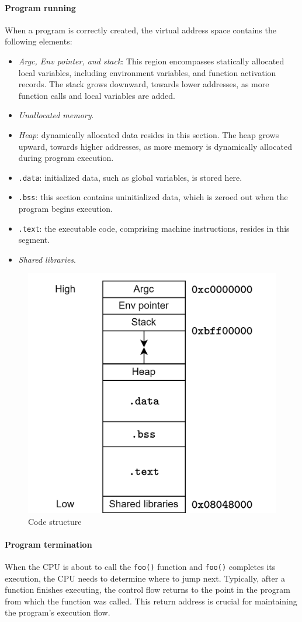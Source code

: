 \paragraph*{Program running}
When a program is correctly created, the virtual address space contains the following elements:
\begin{itemize}
    \item \textit{Argc, Env pointer, and stack}: This region encompasses statically allocated local variables, including environment variables, and function activation records. 
        The stack grows downward, towards lower addresses, as more function calls and local variables are added.
    \item \textit{Unallocated memory}.
    \item \textit{Heap}: dynamically allocated data resides in this section. 
        The heap grows upward, towards higher addresses, as more memory is dynamically allocated during program execution.
    \item \texttt{.data}: initialized data, such as global variables, is stored here.
    \item \texttt{.bss}: this section contains uninitialized data, which is zeroed out when the program begins execution.
    \item \texttt{.text}: the executable code, comprising machine instructions, resides in this segment.
    \item \textit{Shared libraries}. 
\end{itemize}
\begin{figure}[H]
    \centering
    \includegraphics[width=0.6\linewidth]{images/stack.png}
    \caption{Code structure}
\end{figure}

\paragraph*{Program termination}
When the CPU is about to call the \texttt{foo()} function and \texttt{foo()} completes its execution, the CPU needs to determine where to jump next. 
Typically, after a function finishes executing, the control flow returns to the point in the program from which the function was called. 
This return address is crucial for maintaining the program's execution flow.

